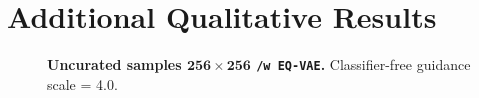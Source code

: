 \clearpage

\section{Additional Qualitative Results}












\begin{figure}[t!]
    \vspace{-15pt}
    \centering
    
    \vspace{-15pt}
    \caption{\textbf{Uncurated  samples $\mathbf{256 \times 256}$ \ditxltwo \texttt{/w EQ-VAE}.} Classifier-free guidance scale = 4.0.}
    \label{fig:appendix-gen-1}
\end{figure}

